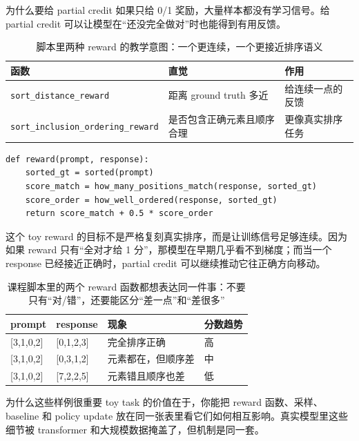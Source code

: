 \documentclass[a4paper]{article}
\begin{document}
\begin{importantbox}{为什么要给 partial credit}
如果只给 0/1 奖励，大量样本都没有学习信号。给 partial credit 可以让模型在“还没完全做对”时也能得到有用反馈。
\end{importantbox}


\begin{table}[H]
\centering
\begin{tabular}{@{}lll@{}}
\toprule
\textbf{函数} & \textbf{直觉} & \textbf{作用} \\
\midrule
\texttt{sort\_distance\_reward} & 距离 ground truth 多近 & 给连续一点的反馈 \\
\texttt{sort\_inclusion\_ordering\_reward} & 是否包含正确元素且顺序合理 & 更像真实排序任务 \\
\bottomrule
\end{tabular}
\caption{脚本里两种 reward 的教学意图：一个更连续，一个更接近排序语义}
\end{table}

\begin{lstlisting}[caption={toy reward pseudocode}]
def reward(prompt, response):
    sorted_gt = sorted(prompt)
    score_match = how_many_positions_match(response, sorted_gt)
    score_order = how_well_ordered(response, sorted_gt)
    return score_match + 0.5 * score_order
\end{lstlisting}

这个 toy reward 的目标不是严格复刻真实排序，而是让训练信号足够连续。因为如果 reward 只有“全对才给 1 分”，那模型在早期几乎看不到梯度；而当一个 response 已经接近正确时，partial credit 可以继续推动它往正确方向移动。

\begin{table}[H]
\centering
\begin{tabular}{@{}p{3.4cm}p{4.8cm}p{3.6cm}p{2.2cm}@{}}
\toprule
\textbf{prompt} & \textbf{response} & \textbf{现象} & \textbf{分数趋势} \\
\midrule
{[}3,1,0,2{]} & {[}0,1,2,3{]} & 完全排序正确 & 高 \\
{[}3,1,0,2{]} & {[}0,3,1,2{]} & 元素都在，但顺序差 & 中 \\
{[}3,1,0,2{]} & {[}7,2,2,5{]} & 元素错且顺序也差 & 低 \\
\bottomrule
\end{tabular}
\caption{课程脚本里的两个 reward 函数都想表达同一件事：不要只有“对/错”，还要能区分“差一点”和“差很多”}
\end{table}

\begin{importantbox}{为什么这些样例很重要}
toy task 的价值在于，你能把 reward 函数、采样、baseline 和 policy update 放在同一张表里看它们如何相互影响。真实模型里这些细节被 transformer 和大规模数据掩盖了，但机制是同一套。
\end{importantbox}
\end{document}
